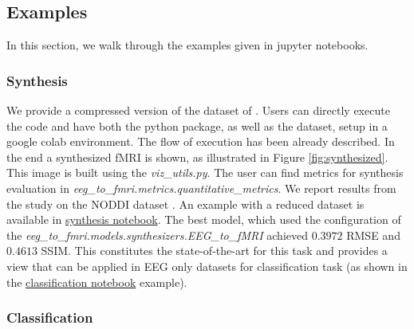 \subsection{Examples}\label{section:examples}

In this section, we walk through the examples given in jupyter notebooks. 

\subsubsection{Synthesis}\label{section:synthesis}


We provide a compressed version of the dataset of \cite{dataset2014noddi}. Users can directly execute the code and have both the python package, as well as the dataset, setup in a google colab environment. The flow of execution has been already described. In the end a synthesized fMRI is shown, as illustrated in Figure \ref{fig:synthesized}. This image is built using the \textit{viz\_utils.py}. The user can find metrics for synthesis evaluation in \textit{eeg\_to\_fmri.metrics.quantitative\_metrics}. We report results from the \cite{calhas2022eeg} study on the NODDI dataset \cite{dataset2014noddi}. An example with a reduced dataset is available in \href{https://github.com/eeg-to-fmri/eeg-to-fmri/blob/main/examples/synthesis.ipynb}{synthesis notebook}. The best model, which used the configuration of the \textit{eeg\_to\_fmri.models.synthesizers.EEG\_to\_fMRI} achieved $0.3972$  RMSE and $0.4613$ SSIM. This constitutes the state-of-the-art for this task and provides a view that can be applied in EEG only datasets for classification task (as shown in the \href{https://github.com/eeg-to-fmri/eeg-to-fmri/blob/main/examples/classification_contrastive.ipynb}{classification notebook} example).

\subsubsection{Classification}\label{section:classification}

